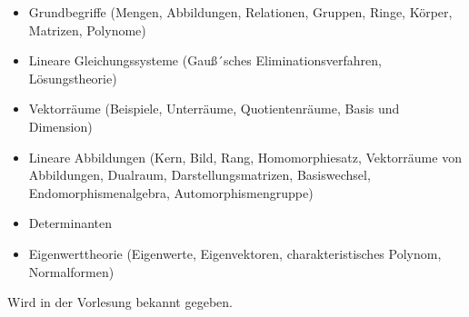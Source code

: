 \begin{course}
\begin{content}
\begin{itemize}\item Grundbegriffe (Mengen, Abbildungen, Relationen, Gruppen, Ringe, Körper, Matrizen, Polynome)   \item Lineare Gleichungssysteme (Gauß´sches Eliminationsverfahren, Lösungstheorie)   \item Vektorräume (Beispiele, Unterräume, Quotientenräume, Basis und Dimension)   \item Lineare Abbildungen (Kern, Bild, Rang, Homomorphiesatz, Vektorräume von Abbildungen, Dualraum, Darstellungsmatrizen, Basiswechsel, Endomorphismenalgebra, Automorphismengruppe)   \item Determinanten   \item Eigenwerttheorie (Eigenwerte, Eigenvektoren, charakteristisches Polynom, Normalformen)  \end{itemize}
\end{content}



\begin{literature}Wird in der Vorlesung bekannt gegeben.

\end{literature}



\end{course}